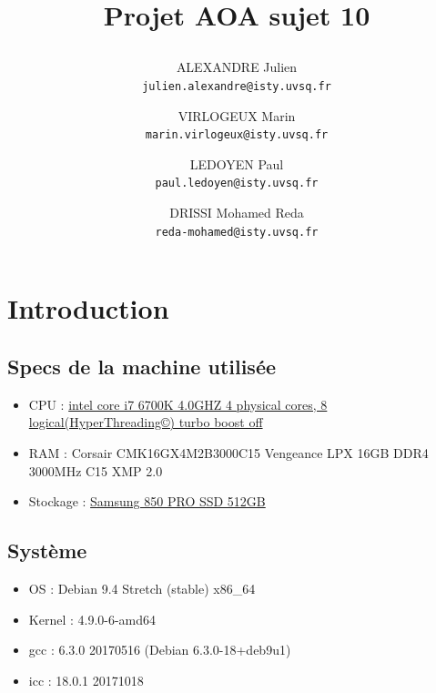 \documentclass{report}
\begin{document}
\title{
  \begin{minipage}\linewidth
      \centering
      Projet AOA sujet 10
      \vskip 5pt
      \author{
        ALEXANDRE Julien \\
        \texttt{julien.alexandre@isty.uvsq.fr}
      \and
        VIRLOGEUX Marin \\
        \texttt{marin.virlogeux@isty.uvsq.fr}
      \and
        LEDOYEN Paul \\
        \texttt{paul.ledoyen@isty.uvsq.fr}
      \and
        DRISSI Mohamed Reda \\
        \texttt{reda-mohamed@isty.uvsq.fr}
      }
    \end{minipage}
}
\maketitle
\newpage
\tableofcontents
\newpage
\section{Introduction}
  \subsection{Specs de la machine utilisée}
    \begin{itemize}
      \item CPU : \href{https://ark.intel.com/products/88195/Intel-Core-i7-6700K-Processor-8M-Cache-up-to-4_20-GHz}
        {intel core i7 6700K 4.0GHZ 4 physical cores, 8 logical(HyperThreading©) turbo boost off}
      \item RAM : Corsair CMK16GX4M2B3000C15 Vengeance LPX 16GB DDR4 3000MHz C15 XMP 2.0
      \item Stockage : \href{http://downloadcenter.samsung.com/content/UM/201711/20171115103115156/Samsung_SSD_850_PRO_Data_Sheet_Rev_3.pdf}
          {Samsung 850 PRO SSD 512GB}
    \end{itemize}
    \subsection{Système}
      \begin{itemize}
      \item OS : Debian 9.4 Stretch (stable) x86\_64
      \item Kernel :  4.9.0-6-amd64
      \item gcc : 6.3.0 20170516 (Debian 6.3.0-18+deb9u1)
      \item icc : 18.0.1 20171018
    \end{itemize}
\end{document}
